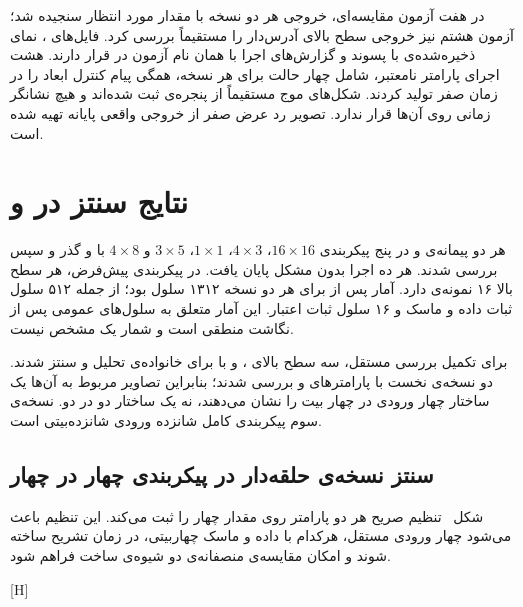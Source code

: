 در هفت آزمون مقایسه‌ای، خروجی هر دو نسخه با مقدار مورد انتظار سنجیده شد؛ آزمون هشتم نیز خروجی سطح بالای آدرس‌دار را مستقیماً بررسی کرد. فایل‌های ،
نمای ذخیره‌شده‌ی  با پسوند  و گزارش‌های اجرا با همان نام آزمون
در  قرار دارند. هشت اجرای پارامتر نامعتبر، شامل چهار حالت برای هر نسخه،
همگی پیام کنترل ابعاد را در زمان صفر تولید کردند. شکل‌های موج مستقیماً از پنجره‌ی
 ثبت شده‌اند و هیچ نشانگر زمانی روی آن‌ها قرار ندارد. تصویر رد عرض صفر
از خروجی واقعی پایانه تهیه شده است.

\section{نتایج سنتز در  و }

هر دو پیمانه‌ی  و  در پنج پیکربندی $16\times16$،
$4\times3$، $1\times1$، $3\times5$ و $4\times8$ با  و گذر
 و سپس  بررسی شدند. هر ده اجرا بدون مشکل پایان یافت.
در پیکربندی پیش‌فرض، هر سطح بالا ۱۶ نمونه‌ی  دارد.
آمار پس از  برای هر دو نسخه ۱۳۱۲ سلول بود؛ از جمله ۵۱۲ سلول ثبات داده و
ماسک و ۱۶ سلول ثبات اعتبار. این آمار متعلق به سلول‌های عمومی  پس از
نگاشت منطقی است و شمار  یک
 مشخص نیست.

برای تکمیل بررسی مستقل، سه سطح بالای ،  و
 با  برای خانواده‌ی
 تحلیل و سنتز شدند. دو نسخه‌ی نخست با پارامترهای
 و  بررسی شدند؛ بنابراین تصاویر مربوط به آن‌ها
یک ساختار چهار ورودی در چهار بیت را نشان می‌دهند، نه یک ساختار دو در دو. نسخه‌ی سوم
پیکربندی کامل شانزده ورودی شانزده‌بیتی است.

\subsection{سنتز نسخه‌ی حلقه‌دار در پیکربندی چهار در چهار}

شکل~ تنظیم صریح هر دو پارامتر روی مقدار چهار را ثبت
می‌کند. این تنظیم باعث می‌شود چهار ورودی مستقل، هرکدام با داده و ماسک چهار‌بیتی، در زمان
تشریح ساخته شوند و امکان مقایسه‌ی منصفانه‌ی دو شیوه‌ی ساخت فراهم شود.

[H]

